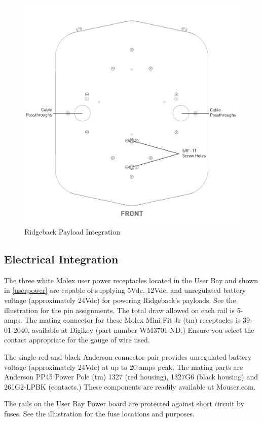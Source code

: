 \documentclass[]{clearpath-latex/clearpath-manual}
\begin{document}
\begin{figure}[!htb]
  \centering
  \includegraphics[width=0.75\linewidth]{Payload_Integration_Plate.pdf}
  \caption{Ridgeback Payload Integration}
  \label{payloadplate}
\end{figure}

\subsection{Electrical Integration}
\label{electrical}

The three white Molex user power receptacles located in the User Bay and shown in \autoref{userpower} are capable of supplying 5Vdc, 12Vdc, and unregulated battery voltage (approximately 24Vdc) for powering Ridgeback's payloads. See the illustration for the pin assignments. The total draw allowed on each rail is 5-amps. The mating connector for these Molex Mini Fit Jr (tm) receptacles is 39-01-2040, available at Digikey (part number WM3701-ND.) Ensure you select the contact appropriate for the gauge of wire used. 

The single red and black Anderson connector pair provides unregulated battery voltage (approximately 24Vdc) at up to 20-amps peak. The mating parts are Anderson PP45 Power Pole (tm) 1327 (red housing), 1327G6 (black housing) and 261G2-LPBK (contacts.) These components are readily available at Mouser.com.

The rails on the User Bay Power board are protected against short circuit by fuses. See the illustration for the fuse locations and purposes. 
\end{document}
